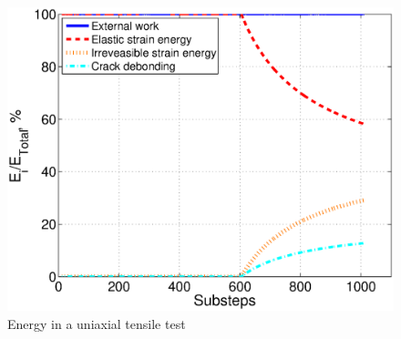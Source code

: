 \documentclass[preprint,review,12pt]{elsarticle}
\begin{document}
\begin{enumerate}
\begin{figure}[htbp]
{\label{fig:PercentagesOfEachEnergy}
\begin{minipage}[b]{0.48\textwidth}
\centering
\includegraphics[width=\textwidth]{MRC/simple/tensile/energypercentage.eps}
\end{minipage}}
\caption{Energy in a uniaxial tensile test}
\label{fig:TensileEnergy}
\end{figure}


\end{enumerate}
\end{document}

